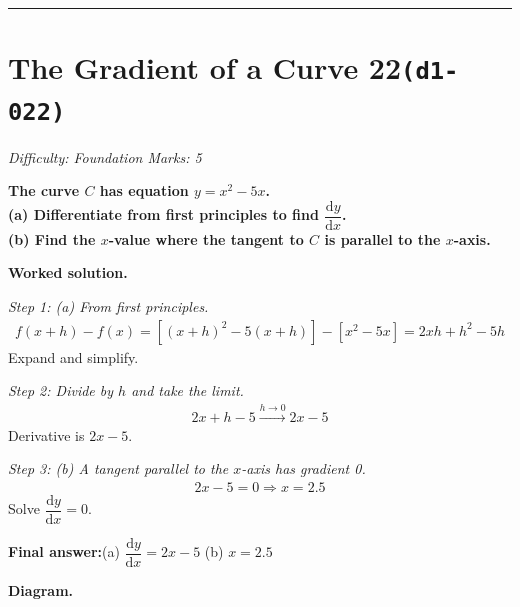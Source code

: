 \documentclass[11pt]{article}
\newcommand{\question}[1]{\par\medskip\noindent\textbf{#1}\par}
\begin{document}
\medskip\hrule

\section*{The Gradient of a Curve 22\quad\small\texttt{(d1-022)}}
\textit{Difficulty: Foundation \quad\textbar\quad Marks: 5}

\question{The curve \( C \) has equation \( y = x^2 - 5x \).\\[3pt]  (a) Differentiate from first principles to find \( \dfrac{\mathrm{d}y}{\mathrm{d}x} \).\\[3pt]  (b) Find the \( x \)-value where the tangent to \( C \) is parallel to the \( x \)-axis.}

\textbf{Worked solution.}

\textit{Step 1: (a) From first principles.}
\[\begin{gathered}
f(x+h) - f(x) = [(x+h)^2 - 5(x+h)] - [x^2 - 5x] = 2xh + h^2 - 5h
\end{gathered}\]
Expand and simplify.

\textit{Step 2: Divide by \( h \) and take the limit.}
\[\begin{gathered}
2x + h - 5 \xrightarrow{h \to 0} 2x - 5
\end{gathered}\]
Derivative is \( 2x - 5 \).

\textit{Step 3: (b) A tangent parallel to the \( x \)-axis has gradient 0.}
\[\begin{gathered}
2x - 5 = 0 \Rightarrow x = 2.5
\end{gathered}\]
Solve \( \dfrac{\mathrm{d}y}{\mathrm{d}x} = 0 \).

\begin{answerbox}
\textbf{Final answer:}\quad (a) \(\displaystyle  \dfrac{\mathrm{d}y}{\mathrm{d}x} = 2x - 5 \) \quad  (b) \(\displaystyle  x = 2.5 \)
\end{answerbox}
\textbf{Diagram.}
\end{document}
